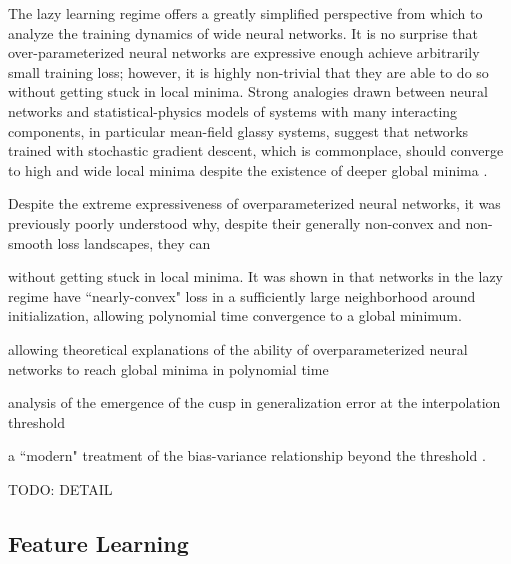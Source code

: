 \documentclass[a4paper, 12pt]{article}
\begin{document}
The lazy learning regime offers a greatly simplified perspective from which to analyze the training dynamics of wide neural networks. It is no surprise that over-parameterized neural networks are expressive enough achieve arbitrarily small training loss; however, it is highly non-trivial that they are able to do so without getting stuck in local minima. Strong analogies drawn between neural networks and statistical-physics models of systems with many interacting components, in particular mean-field glassy systems, suggest that networks trained with stochastic gradient descent, which is commonplace, should converge to high and wide local minima despite the existence of deeper global minima \cite{choromanskaLossSurfacesMultilayer}. 

Despite the extreme expressiveness of overparameterized neural networks, it was previously poorly understood why, despite their generally non-convex and non-smooth loss landscapes, they can 

without getting stuck in local minima. It was shown in \cite{allen-zhuConvergenceTheoryDeep2019} that networks in the lazy regime have ``nearly-convex" loss in a sufficiently large neighborhood around initialization, allowing polynomial time convergence to a global minimum.

allowing theoretical explanations of the ability of overparameterized neural networks to reach global minima in polynomial time \cite{allen-zhuConvergenceTheoryDeep2019}

analysis of the emergence of the cusp in generalization error at the interpolation threshold \cite{meiGeneralizationErrorRandom2019, geigerScalingDescriptionGeneralization2019}

 a ``modern" treatment of the bias-variance relationship beyond the threshold \cite{dascoliDoubleTroubleDouble2020}. 

TODO: DETAIL

\subsection{Feature Learning}
\end{document}
